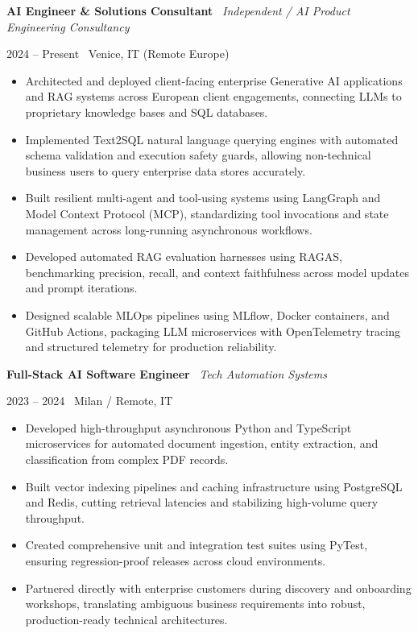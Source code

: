 \documentclass[a4paper,10pt]{article}
\newcommand{\role}[4]{%
  \vspace{2pt}\noindent
  \begin{minipage}[t]{0.70\textwidth}\raggedright\textbf{#1} \textbullet\ \textit{#3}\end{minipage}%
  \hfill
  \begin{minipage}[t]{0.28\textwidth}\raggedleft\footnotesize\color{gray}#2 \textbullet\ #4\end{minipage}%
  \vspace{1pt}%
}
\begin{document}
\role{AI Engineer \& Solutions Consultant}{2024 -- Present}{Independent / AI Product Engineering Consultancy}{Venice, IT (Remote Europe)}
\begin{itemize}
  \item Architected and deployed client-facing enterprise Generative AI applications and RAG systems across European client engagements, connecting LLMs to proprietary knowledge bases and SQL databases.
  \item Implemented Text2SQL natural language querying engines with automated schema validation and execution safety guards, allowing non-technical business users to query enterprise data stores accurately.
  \item Built resilient multi-agent and tool-using systems using LangGraph and Model Context Protocol (MCP), standardizing tool invocations and state management across long-running asynchronous workflows.
  \item Developed automated RAG evaluation harnesses using RAGAS, benchmarking precision, recall, and context faithfulness across model updates and prompt iterations.
  \item Designed scalable MLOps pipelines using MLflow, Docker containers, and GitHub Actions, packaging LLM microservices with OpenTelemetry tracing and structured telemetry for production reliability.
\end{itemize}

\vspace{3pt}
\role{Full-Stack AI Software Engineer}{2023 -- 2024}{Tech Automation Systems}{Milan / Remote, IT}
\begin{itemize}
  \item Developed high-throughput asynchronous Python and TypeScript microservices for automated document ingestion, entity extraction, and classification from complex PDF records.
  \item Built vector indexing pipelines and caching infrastructure using PostgreSQL and Redis, cutting retrieval latencies and stabilizing high-volume query throughput.
  \item Created comprehensive unit and integration test suites using PyTest, ensuring regression-proof releases across cloud environments.
  \item Partnered directly with enterprise customers during discovery and onboarding workshops, translating ambiguous business requirements into robust, production-ready technical architectures.
\end{itemize}
\end{document}

